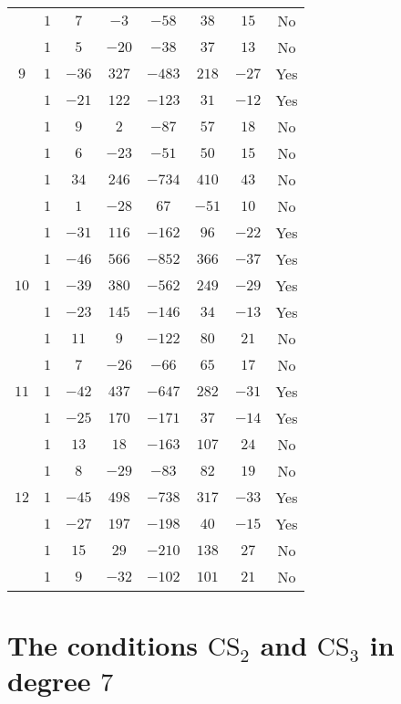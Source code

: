 \documentclass{amsart}
\theoremstyle{plain}
\theoremstyle{definition}
\theoremstyle{remark}
\begin{document}
\begin{small}
\begin{longtable}{|c||c|c|c|c|c|c|c|}
& $1$ & $7$ & $-3$ & $-58$ & $38$ & $15$ & No \\ \cline{2-8}
& $1$ & $5$ & $-20$ & $-38$ & $37$ & $13$ & No \\ \hline
$9$ & $1$ & $-36$ & $327$ & $-483$ & $218$ & $-27$ & Yes \\ \cline{2-8}
& $1$ & $-21$ & $122$ & $-123$ & $31$ & $-12$ & Yes \\ \cline{2-8}
& $1$ & $9$ & $2$ & $-87$ & $57$ & $18$ & No \\ \cline{2-8}
& $1$ & $6$ & $-23$ & $-51$ & $50$ & $15$ & No \\ \cline{2-8}
& $1$ & $34$ & $246$ & $-734$ & $410$ & $43$ & No \\ \cline{2-8}
& $1$ & $1$ & $-28$ & $67$ & $-51$ & $10$ & No \\ \cline{2-8}
& $1$ & $-31$ & $116$ & $-162$ & $96$ & $-22$ & Yes \\ \cline{2-8}
& $1$ & $-46$ & $566$ & $-852$ & $366$ & $-37$ & Yes \\ \hline
$10$ & $1$ & $-39$ & $380$ & $-562$ & $249$ & $-29$ & Yes \\ \cline{2-8}
& $1$ & $-23$ & $145$ & $-146$ & $34$ & $-13$ & Yes \\ \cline{2-8}
& $1$ & $11$ & $9$ & $-122$ & $80$ & $21$ & No \\ \cline{2-8}
& $1$ & $7$ & $-26$ & $-66$ & $65$ & $17$ & No \\ \hline
$11$ & $1$ & $-42$ & $437$ & $-647$ & $282$ & $-31$ & Yes \\ \cline{2-8}
& $1$ & $-25$ & $170$ & $-171$ & $37$ & $-14$ & Yes \\ \cline{2-8}
& $1$ & $13$ & $18$ & $-163$ & $107$ & $24$ & No \\ \cline{2-8}
& $1$ & $8$ & $-29$ & $-83$ & $82$ & $19$ & No \\ \hline
$12$ & $1$ & $-45$ & $498$ & $-738$ & $317$ & $-33$ & Yes \\ \cline{2-8}
& $1$ & $-27$ & $197$ & $-198$ & $40$ & $-15$ & Yes \\ \cline{2-8}
& $1$ & $15$ & $29$ & $-210$ & $138$ & $27$ & No \\ \cline{2-8}
& $1$ & $9$ & $-32$ & $-102$ & $101$ & $21$ & No \\ \hline
\end{longtable} 


\section{The conditions $\mathrm{CS}_2$ and $\mathrm{CS}_3$ in degree $7$}\label{cs23}


\end{small}
\end{document}
